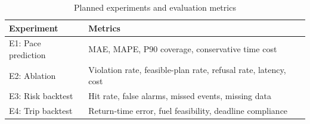 \begin{table}[htbp]
\caption{Planned experiments and evaluation metrics}
\label{tab:evaluation}
\centering\small
\begin{tabular}{p{}p{}}
\toprule
Experiment & Metrics \\\midrule
E1: Pace prediction & MAE, MAPE, P90 coverage, conservative time cost \\
E2: Ablation & Violation rate, feasible-plan rate, refusal rate, latency, cost \\
E3: Risk backtest & Hit rate, false alarms, missed events, missing data \\
E4: Trip backtest & Return-time error, fuel feasibility, deadline compliance \\\bottomrule
\end{tabular}
\end{table}
